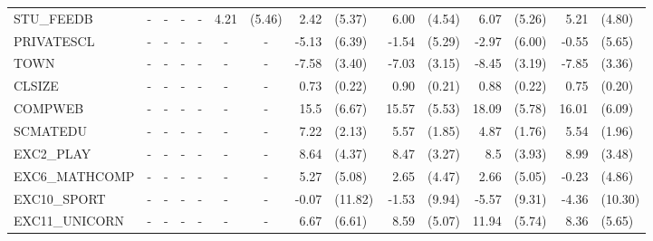 \documentclass[12pt]{article}%
\begin{document}
\begin{table}[H]
\begin{tabular}{lrlrlrlrlrlrlrl}
			STU\_FEEDB & \multicolumn{1}{c}{-} & \multicolumn{1}{c}{-} & \multicolumn{1}{c}{-} & \multicolumn{1}{c}{-} & 4.21  & (5.46) & 2.42  & (5.37) & 6.00  & (4.54) & 6.07  & (5.26) & 5.21  & (4.80) \\[0.2em]
			PRIVATESCL & \multicolumn{1}{c}{-} & \multicolumn{1}{c}{-} & \multicolumn{1}{c}{-} & \multicolumn{1}{c}{-} & \multicolumn{1}{c}{-} & \multicolumn{1}{c}{-} & -5.13 & (6.39) & -1.54 & (5.29) & -2.97 & (6.00) & -0.55 & (5.65) \\[0.2em]
			TOWN  & \multicolumn{1}{c}{-} & \multicolumn{1}{c}{-} & \multicolumn{1}{c}{-} & \multicolumn{1}{c}{-} & \multicolumn{1}{c}{-} & \multicolumn{1}{c}{-} & -7.58 & (3.40) & -7.03 & (3.15) & -8.45 & (3.19) & -7.85 & (3.36) \\[0.2em]
			CLSIZE & \multicolumn{1}{c}{-} & \multicolumn{1}{c}{-} & \multicolumn{1}{c}{-} & \multicolumn{1}{c}{-} & \multicolumn{1}{c}{-} & \multicolumn{1}{c}{-} & 0.73  & (0.22) & 0.90  & (0.21) & 0.88  & (0.22) & 0.75  & (0.20) \\[0.2em]
			COMPWEB & \multicolumn{1}{c}{-} & \multicolumn{1}{c}{-} & \multicolumn{1}{c}{-} & \multicolumn{1}{c}{-} & \multicolumn{1}{c}{-} & \multicolumn{1}{c}{-} & 15.5  & (6.67) & 15.57 & (5.53) & 18.09 & (5.78) & 16.01 & (6.09) \\[0.2em]
			SCMATEDU & \multicolumn{1}{c}{-} & \multicolumn{1}{c}{-} & \multicolumn{1}{c}{-} & \multicolumn{1}{c}{-} & \multicolumn{1}{c}{-} & \multicolumn{1}{c}{-} & 7.22  & (2.13) & 5.57  & (1.85) & 4.87  & (1.76) & 5.54  & (1.96) \\[0.2em]
			EXC2\_PLAY & \multicolumn{1}{c}{-} & \multicolumn{1}{c}{-} & \multicolumn{1}{c}{-} & \multicolumn{1}{c}{-} & \multicolumn{1}{c}{-} & \multicolumn{1}{c}{-} & 8.64  & (4.37) & 8.47  & (3.27) & 8.5   & (3.93) & 8.99  & (3.48) \\[0.2em]
			EXC6\_MATHCOMP & \multicolumn{1}{c}{-} & \multicolumn{1}{c}{-} & \multicolumn{1}{c}{-} & \multicolumn{1}{c}{-} & \multicolumn{1}{c}{-} & \multicolumn{1}{c}{-} & 5.27  & (5.08) & 2.65  & (4.47) & 2.66  & (5.05) & -0.23 & (4.86) \\[0.2em]
			EXC10\_SPORT & \multicolumn{1}{c}{-} & \multicolumn{1}{c}{-} & \multicolumn{1}{c}{-} & \multicolumn{1}{c}{-} & \multicolumn{1}{c}{-} & \multicolumn{1}{c}{-} & -0.07 & (11.82) & -1.53 & (9.94) & -5.57 & (9.31) & -4.36 & (10.30) \\[0.2em]
			EXC11\_UNICORN & \multicolumn{1}{c}{-} & \multicolumn{1}{c}{-} & \multicolumn{1}{c}{-} & \multicolumn{1}{c}{-} & \multicolumn{1}{c}{-} & \multicolumn{1}{c}{-} & 6.67  & (6.61) & 8.59  & (5.07) & 11.94 & (5.74) & 8.36  & (5.65) \\[0.2em]

\end{tabular}
\end{table}
\end{document}
